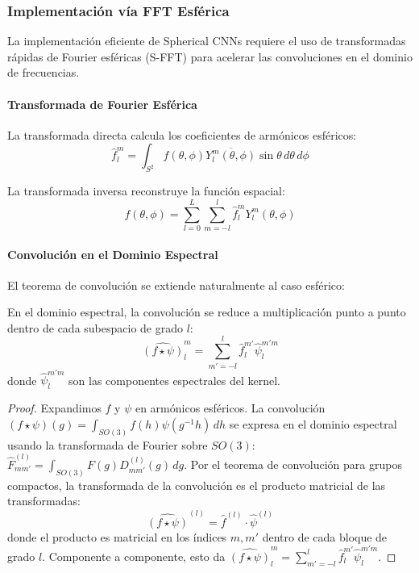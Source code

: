 \subsubsection{Implementación vía FFT Esférica}

La implementación eficiente de Spherical CNNs requiere el uso de transformadas rápidas de Fourier esféricas (S-FFT) para acelerar las convoluciones en el dominio de frecuencias.

\paragraph{Transformada de Fourier Esférica}

\begin{definition}
La transformada directa calcula los coeficientes de armónicos esféricos:
\begin{equation}
\hat{f}_l^m = \int_{S^2} f(\theta, \phi) \overline{Y_l^m(\theta, \phi)} \sin \theta \, d\theta \, d\phi
\end{equation}
\end{definition}

\begin{definition}
La transformada inversa reconstruye la función espacial:
\begin{equation}
f(\theta, \phi) = \sum_{l=0}^{L} \sum_{m=-l}^{l} \hat{f}_l^m Y_l^m(\theta, \phi)
\end{equation}
\end{definition}

\paragraph{Convolución en el Dominio Espectral}

El teorema de convolución se extiende naturalmente al caso esférico:

\begin{theorem}
En el dominio espectral, la convolución se reduce a multiplicación punto a punto dentro de cada subespacio de grado $l$:
\begin{equation}
\widehat{(f \star \psi)}_l^m = \sum_{m'=-l}^{l} \hat{f}_l^{m'} \hat{\psi}_l^{m'm}
\end{equation}
donde $\hat{\psi}_l^{m'm}$ son las componentes espectrales del kernel.
\end{theorem}

\begin{proof}
Expandimos $f$ y $\psi$ en armónicos esféricos. La convolución $(f \star \psi)(g) = \int_{SO(3)} f(h) \psi(g^{-1}h) \, dh$ se expresa en el dominio espectral usando la transformada de Fourier sobre $SO(3)$: $\hat{F}^{(l)}_{mm'} = \int_{SO(3)} F(g) D^{(l)}_{mm'}(g) \, dg$. Por el teorema de convolución para grupos compactos, la transformada de la convolución es el producto matricial de las transformadas:
\[
\widehat{(f \star \psi)}^{(l)} = \hat{f}^{(l)} \cdot \hat{\psi}^{(l)}
\]
donde el producto es matricial en los índices $m, m'$ dentro de cada bloque de grado $l$. Componente a componente, esto da $\widehat{(f \star \psi)}_l^m = \sum_{m'=-l}^{l} \hat{f}_l^{m'} \hat{\psi}_l^{m'm}$.
\end{proof}

